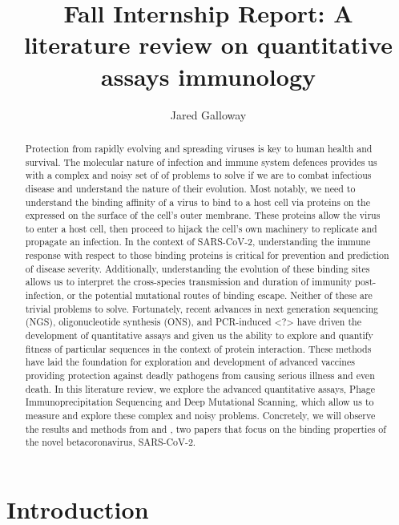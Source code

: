 \documentclass{article}
\title{Fall Internship Report: A literature review on quantitative assays immunology}
\author{Jared Galloway}
\begin{document}
\maketitle

\begin{abstract}
Protection from rapidly evolving and spreading viruses is key to human health and survival.
The molecular nature of infection and immune system defences provides us with a complex and noisy set of of problems to solve
if we are to combat infectious disease and understand the nature of their evolution.
Most notably, we need to understand the binding affinity of a virus to bind to a host cell via proteins on the expressed on the surface of the cell's outer membrane.
These proteins allow the virus to enter a host cell, then proceed to hijack the cell's own machinery to replicate and propagate an infection.
In the context of SARS-CoV-2, understanding the immune response with respect to those binding proteins is critical
for prevention and prediction of disease severity.
Additionally, understanding the evolution of these binding sites allows us to interpret the cross-species transmission
and duration of immunity post-infection, or the potential mutational routes of binding escape.
Neither of these are trivial problems to solve. 
Fortunately, recent advances in next generation sequencing (NGS), oligonucleotide synthesis (ONS), and PCR-induced <?>
have driven the development of quantitative assays and given us the ability to explore and quantify fitness of particular sequences in the context of protein interaction.
These methods have laid the foundation for exploration and development of advanced vaccines providing protection against deadly pathogens
from causing serious illness and even death.
In this literature review, we explore the advanced quantitative assays, Phage Immunoprecipitation Sequencing
and Deep Mutational Scanning, which allow us to measure and explore these complex and noisy problems.
Concretely, we will observe the results and methods from \citet{Shrock2020} and \citet{Starr2020}, 
two papers that focus on the binding properties of the novel betacoronavirus, SARS-CoV-2.
\end{abstract}


\section*{Introduction}
\end{document}
